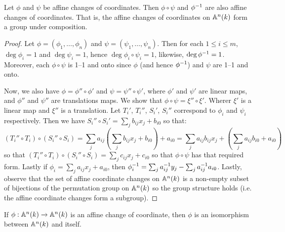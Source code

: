 \begin{theorem}\label{theorem_2.2.3}
  Let $\phi$ and $\psi$ be affine changes of coordinates. Then $\phi \circ \psi$
  and $\phi^{-1}$ are also affine changes of coordinates. That is, the affine
  changes of coordinates on $\mathbb{A}^n(k)$ form a group under composition.
\end{theorem}
\begin{proof}
  Let $\phi=(\phi_1, \dots, \phi_n)$ and $\psi=(\psi_1, \dots, \psi_n)$. Then
  for each $1 \leq i \leq m$, $\deg{\phi_i}=1$ and $\deg{\psi_i}=1$, hence
  $\deg{\phi_i \circ \psi_i}=1$, likewise, $\deg{\phi^{-1}}=1$. Moreover, each
  $\phi \circ \psi$ is 1--1 and onto since $\phi$ (and hence $\phi^{-1}$) and
  $\psi$ are 1--1 and onto.

  Now, we also have $\phi=\phi'' \circ \phi'$ and $\psi=\psi'' \circ \psi'$,
  where $\phi'$ and $\psi'$ are linear maps, and $\phi''$ and  $\psi''$ are
  translations maps. We show that $\phi \circ \psi=\xi'' \circ \xi'$. Wherer
  $\xi'$ is a linear map and  $\xi''$ is a translation. Let $T_i'$,  $T_i''$,
  $S_i'$,  $S_i''$ correspond to $\phi_i$ and  $\psi_i$ respectively. Then we
  have $S_i'' \circ S_i'=\sum_{j}{b_{ij}x_j}+b_{i0}$ so that:
  \begin{equation*}
    (T_i'' \circ T_i) \circ (S_i'' \circ S_i)=
    \sum_{j}{a_{ij}(\sum_{j}{b_{ij}x_j}+b_{i0})}+a_{i0}=
    \sum_j{a_{ij}b_{ij}x_j}+(\sum_{j}{a_{ij}b_{i0}}+a_{i0})
  \end{equation*}
  so that $(T_i'' \circ T_i) \circ (S_i'' \circ S_i)=\sum_{j}{c_{ij}x_j}+c_{i0}$
  so that $\phi \circ \psi$ has that required form. Lastly if
  $\phi_i=\sum_{j}{a_{ij}x_j}+a_{i0}$, then
  $\phi^{-1}_i=\sum_{j}{a_{ij}^{-1}y_j}-\sum_j{a_{ij}^{-1}a_{i0}}$. Lastly,
  observe that the set of affine coordinate changes on $\mathbb{A}^n(k)$ is a non-empty
  subset of bijections of the permutation group on $\mathbb{A}^n(k)$ so the group
  structure holds (i.e. the affine coordinate changes form a subgroup).
\end{proof}
\begin{corollary}
  If $\phi:\mathbb{A}^n(k) \xrightarrow{} \mathbb{A}^n(k)$ is an affine change of coordinate,
  then $\phi$ is an isomorphism between $\mathbb{A}^n(k)$ and itself.
\end{corollary}
